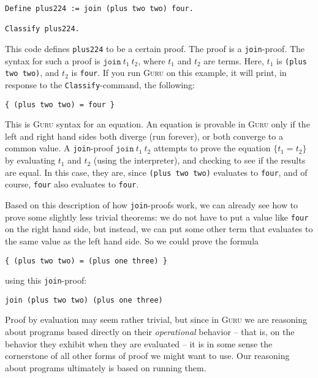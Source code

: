 \documentclass{book}[12pt]
\newcommand{\guru}[0]{\textsc{Guru}\xspace}
\begin{document}
\begin{verbatim}
Define plus224 := join (plus two two) four.

Classify plus224.
\end{verbatim}

 \noindent This code defines \texttt{plus224} to be a certain proof.
The proof is a \texttt{join}-proof.  The syntax for such a proof is
$\texttt{join}\ t_1\ t_2$, where $t_1$ and $t_2$ are terms.  Here,
$t_1$ is \texttt{(plus two two)}, and $t_2$ is \texttt{four}.  If you
run \guru on this example, it will print, in response to the
\texttt{Classify}-command, the following:

\begin{verbatim}
{ (plus two two) = four }
\end{verbatim}

\noindent This is \guru syntax for an equation.  An equation is
provable in \guru only if the left and right hand sides both diverge
(run forever), or both converge to a common value.  A
\texttt{join}-proof $\texttt{join}\ t_1\ t_2$ attempts to prove the
equation $\{ t_1 = t_2 \}$ by evaluating $t_1$ and $t_2$ (using the
interpreter), and checking to see if the results are equal.  In this
case, they are, since \texttt{(plus two two)} evaluates to
\texttt{four}, and of course, \texttt{four} also evaluates to
\texttt{four}.

Based on this description of how \texttt{join}-proofs work, we can
already see how to prove some slightly less trivial theorems: we do not
have to put a value like \texttt{four} on the right hand side, but instead,
we can put some other term that evaluates to the same value as the left hand
side.  So we could prove the formula

\begin{verbatim}
{ (plus two two) = (plus one three) }
\end{verbatim}

\noindent using this \texttt{join}-proof:

\begin{verbatim}
join (plus two two) (plus one three)
\end{verbatim}

\noindent Proof by evaluation may seem rather trivial, but since in
\guru we are reasoning about programs based directly on their
\emph{operational} behavior -- that is, on the behavior they exhibit
when they are evaluated -- it is in some sense the cornerstone of all
other forms of proof we might want to use.  Our reasoning about
programs ultimately is based on running them.
\end{document}
